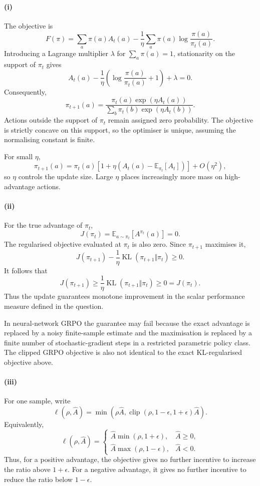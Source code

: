 \documentclass[11pt]{article}
\begin{document}
\paragraph{(i)}
The objective is
\[
F(\pi)
=
\sum_a\pi(a)A_t(a)
-\frac{1}{\eta}
\sum_a\pi(a)\log\frac{\pi(a)}{\pi_t(a)}.
\]
Introducing a Lagrange multiplier $\lambda$ for $\sum_a\pi(a)=1$, stationarity
on the support of $\pi_t$ gives
\[
A_t(a)
-\frac{1}{\eta}
\left(
\log\frac{\pi(a)}{\pi_t(a)}+1
\right)
+\lambda=0.
\]
Consequently,
\[
\boxed{
\pi_{t+1}(a)
=
\frac{\pi_t(a)\exp(\eta A_t(a))}
{\sum_b\pi_t(b)\exp(\eta A_t(b))}
}.
\]
Actions outside the support of $\pi_t$ remain assigned zero probability. The
objective is strictly concave on this support, so the optimiser is unique,
assuming the normalising constant is finite.

For small $\eta$,
\[
\pi_{t+1}(a)
=
\pi_t(a)
\left[
1+\eta
\left(
A_t(a)-\mathbb{E}_{\pi_t}[A_t]
\right)
\right]
+O(\eta^2),
\]
so $\eta$ controls the update size. Large $\eta$ places increasingly more mass
on high-advantage actions.

\paragraph{(ii)}
For the true advantage of $\pi_t$,
\[
J(\pi_t)
=
\mathbb{E}_{a\sim\pi_t}[A^{\pi_t}(a)]
=0.
\]
The regularised objective evaluated at $\pi_t$ is also zero. Since
$\pi_{t+1}$ maximises it,
\[
J(\pi_{t+1})
-\frac{1}{\eta}
\operatorname{KL}(\pi_{t+1}\Vert\pi_t)
\geq 0.
\]
It follows that
\[
\boxed{
J(\pi_{t+1})
\geq
\frac{1}{\eta}
\operatorname{KL}(\pi_{t+1}\Vert\pi_t)
\geq 0
=
J(\pi_t).
}
\]
Thus the update guarantees monotone improvement in the scalar performance
measure defined in the question.

In neural-network GRPO the guarantee may fail because the exact advantage is
replaced by a noisy finite-sample estimate and the maximisation is replaced by
a finite number of stochastic-gradient steps in a restricted parametric policy
class. The clipped GRPO objective is also not identical to the exact
KL-regularised objective above.

\paragraph{(iii)}
For one sample, write
\[
\ell(\rho,\hat A)
=
\min\left(
\rho\hat A,
\operatorname{clip}(\rho,1-\epsilon,1+\epsilon)\hat A
\right).
\]
Equivalently,
\[
\ell(\rho,\hat A)
=
\begin{cases}
\hat A\min(\rho,1+\epsilon), & \hat A\geq 0,\\[2mm]
\hat A\max(\rho,1-\epsilon), & \hat A<0.
\end{cases}
\]
Thus, for a positive advantage, the objective gives no further incentive to
increase the ratio above $1+\epsilon$. For a negative advantage, it gives no
further incentive to reduce the ratio below $1-\epsilon$.
\end{document}
